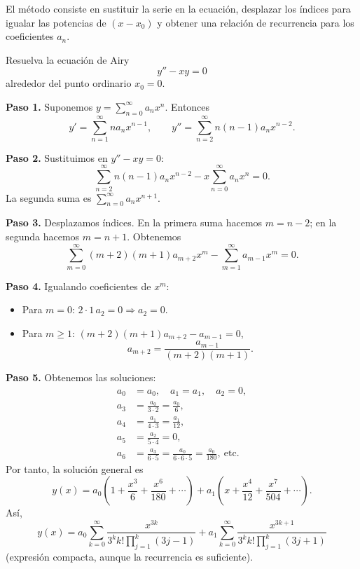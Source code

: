 El método consiste en sustituir la serie en la ecuación, desplazar los índices para igualar las potencias de $(x-x_0)$ y obtener una relación de recurrencia para los coeficientes $a_n$.

\begin{example}
  Resuelva la ecuación de Airy
  \[
    y'' - x y = 0
  \]
  alrededor del punto ordinario $x_0=0$.
  \begin{myproof}
    \textbf{Paso 1.} Suponemos $y=\sum_{n=0}^{\infty} a_n x^n$. Entonces
    \[
      y'=\sum_{n=1}^{\infty} n a_n x^{n-1},\qquad
      y''=\sum_{n=2}^{\infty} n(n-1) a_n x^{n-2}.
    \]
    
    \textbf{Paso 2.} Sustituimos en $y'' - x y=0$:
    \[
      \sum_{n=2}^{\infty} n(n-1) a_n x^{n-2}
      - x\sum_{n=0}^{\infty} a_n x^n = 0.
    \]
    La segunda suma es $\sum_{n=0}^{\infty} a_n x^{n+1}$.
    
    \textbf{Paso 3.} Desplazamos índices. En la primera suma hacemos $m=n-2$; en la segunda hacemos $m=n+1$. Obtenemos
    \[
      \sum_{m=0}^{\infty} (m+2)(m+1) a_{m+2} x^m
      - \sum_{m=1}^{\infty} a_{m-1} x^m = 0.
    \]
    
    \textbf{Paso 4.} Igualando coeficientes de $x^m$:
    \begin{itemize}
      \item Para $m=0$: $2\cdot 1\, a_2 = 0 \Rightarrow a_2=0$.
      \item Para $m\ge 1$: $(m+2)(m+1) a_{m+2} - a_{m-1} = 0$,
        \[
          a_{m+2} = \frac{a_{m-1}}{(m+2)(m+1)}.
        \]
    \end{itemize}
    
    \textbf{Paso 5.} Obtenemos las soluciones:
    \begin{align*}
      a_0 &= a_0,\quad a_1=a_1,\quad a_2=0,\\
      a_3 &= \frac{a_0}{3\cdot2} = \frac{a_0}{6},\\
      a_4 &= \frac{a_1}{4\cdot3} = \frac{a_1}{12},\\
      a_5 &= \frac{a_2}{5\cdot4}=0,\\
      a_6 &= \frac{a_3}{6\cdot5} = \frac{a_0}{6\cdot6\cdot5} = \frac{a_0}{180},\ \text{etc.}
    \end{align*}
    Por tanto, la solución general es
    \[
      y(x)=a_0\left(1+\frac{x^3}{6}+\frac{x^6}{180}+\cdots\right)
      + a_1\left(x+\frac{x^4}{12}+\frac{x^7}{504}+\cdots\right).
    \]
    Así,
    \[
      \boxed{y(x)=a_0\sum_{k=0}^{\infty}\frac{x^{3k}}{3^k k! \prod_{j=1}^{k}(3j-1)}
      + a_1\sum_{k=0}^{\infty}\frac{x^{3k+1}}{3^k k! \prod_{j=1}^{k}(3j+1)}}
    \]
    (expresión compacta, aunque la recurrencia es suficiente).
  \end{myproof}
\end{example}

